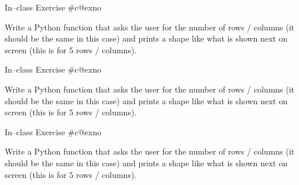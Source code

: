 \documentclass[aspectratio=169, 12pt, xcolor=table]{beamer}
\makeatletter
\newcommand{\arabicthree}[1]{\expandafter\@arabicthree\csname c@#1\endcsname}
\newcommand{\@arabicthree}[1]{\ifnum #1<100 0\fi\ifnum #1<10 0\fi\number#1}
\newcounter{exno}
\newcommand{\exno}{\stepcounter{exno}In--class Exercise \#\arabicthree{exno}}
\makeatother
\begin{document}
	\begin{frame}{\exno}
		\begin{minipage}{0.5\textwidth}
			Write a Python function that asks the user for the number of rows / columns (it should be the same in this case) and prints a shape like what is shown next on screen (this is for 5 rows / columns).
		\end{minipage}\hfill
		\begin{minipage}{0.45\textwidth}
			\centering
		\end{minipage}
	\end{frame}
	
	\begin{frame}{\exno}
		\begin{minipage}{0.5\textwidth}
			Write a Python function that asks the user for the number of rows / columns (it should be the same in this case) and prints a shape like what is shown next on screen (this is for 5 rows / columns).
		\end{minipage}\hfill
		\begin{minipage}{0.45\textwidth}
			\centering
		\end{minipage}
	\end{frame}

	\begin{frame}{\exno}
		\begin{minipage}{0.5\textwidth}
			Write a Python function that asks the user for the number of rows / columns (it should be the same in this case) and prints a shape like what is shown next on screen (this is for 5 rows / columns).
		\end{minipage}\hfill
		\begin{minipage}{0.45\textwidth}
			\centering
		\end{minipage}
	\end{frame}
	
\end{document}
